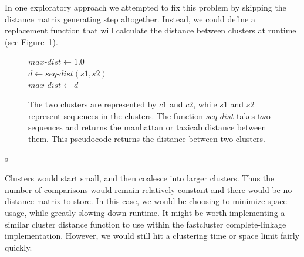 In one exploratory approach we attempted to fix this problem by skipping the distance matrix generating step altogether.
Instead, we could define a replacement function that will calculate the distance between clusters at runtime (see Figure~\ref{code:LazyClustering}).



\begin{figure}[h!]
\begin{algorithm}[H]
 \SetAlgoLined

\BlankLine
 $max$-$dist \gets 1.0$\\
  {
    {
    $d \gets seq$-$dist(s1, s2)$\\
     {
      $max$-$dist \gets d$
    }
   }
 }
\end{algorithm}
\caption[Pseudocode showing a distance function for two clusters.]{The two clusters are represented by $c1$ and $c2$, while $s1$ and $s2$ represent sequences in the clusters. The function $seq$-$dist$ takes two sequences and returns the manhattan or taxicab distance between them. This pseudocode returns the distance between two clusters.}
\label{code:LazyClustering}
\end{figure}s

Clusters would start small, and then coalesce into larger clusters.
Thus the number of comparisons would remain relatively constant and there would be no distance matrix to store.
In this case, we would be choosing to minimize space usage, while greatly slowing down runtime.
It might be worth implementing a similar cluster distance function to use within the fastcluster complete-linkage implementation.
However, we would still hit a clustering time or space limit fairly quickly.

